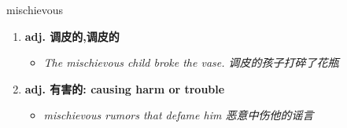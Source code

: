 
\begin{frame}
{\huge mischievous}
\begin{center}
\begin{enumerate}\Large
  \item \textbf{adj. 调皮的,调皮的}
  \begin{itemize}
    \item \em{\Large{The mischievous child broke the vase. 调皮的孩子打碎了花瓶}}
  \end{itemize}
  \item \textbf{adj. 有害的: causing harm or trouble}
  \begin{itemize}
    \item \em{\Large{mischievous rumors that defame him 恶意中伤他的谣言}}
  \end{itemize}
\end{enumerate}
\end{center}
\end{frame}
